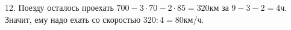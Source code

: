 12. Поезду осталось проехать $700-3\cdot70-2\cdot85=320$км за $9-3-2=4$ч. Значит, ему надо ехать со скоростью $320:4=80$км/ч.\\
